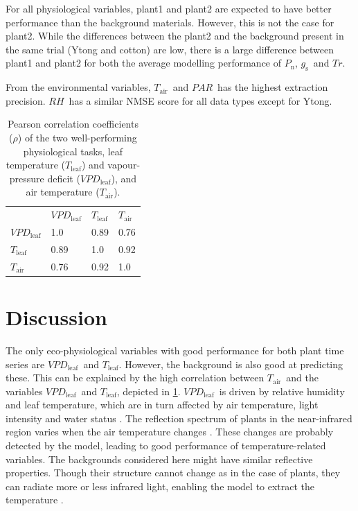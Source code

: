 \documentclass[10pt,authoryear,a4paper]{elsarticle}
\newcommand{\VPDL}{$VPD_\text{leaf}$}
\newcommand{\Tair}{$T_\text{air}$}
\newcommand{\Tleaf}{$T_\text{leaf}$}
\newcommand{\Cond}{$g_\text{s}$}
\newcommand{\Photo}{$P_\text{n}$}
\newcommand{\Transp}{$Tr$}
\newcommand{\RH}{$RH$}
\newcommand{\PAR}{$PAR$}
\begin{document}
        For all physiological variables, plant1 and plant2 are expected to have better performance than the background materials. However, this is not the case for plant2. While the differences between the plant2 and the background present in the same trial (Ytong and cotton) are low, there is a large difference between plant1 and plant2 for both the average modelling performance of \Photo, \Cond\ and \Transp.  
        
        From the environmental variables, \Tair\ and \PAR\ has the highest extraction precision. \RH\ has a similar NMSE score for all data types except for Ytong. 
        
        
        \begin{table}[thb]
            \centering
            \begin{tabular}{llll}
            \toprule
                       & \textbf{\VPDL} & \textbf{\Tleaf} & \textbf{\Tair} \\
                \textbf{\VPDL}  & 1.0   & 0.89   & 0.76  \\ 
                \textbf{\Tleaf} & 0.89  & 1.0    & 0.92  \\
                \textbf{\Tair}  & 0.76  & 0.92   & 1.0   \\ \bottomrule 
            \end{tabular}
            \caption{Pearson correlation coefficients ($\rho$) of the two well-performing physiological tasks, leaf temperature (\Tleaf) and vapour-pressure deficit (\VPDL), and air temperature (\Tair).}
            \label{physiological-environment-correlation}
        \end{table}
        
\section{Discussion}
    
    The only eco-physiological variables with good performance for both plant time series are \VPDL\ and \Tleaf. However, the background is also good at predicting these. This can be explained by the high correlation between \Tair\ and the variables \VPDL\ and \Tleaf, depicted in \cref{physiological-environment-correlation}. \VPDL\ is driven by relative humidity and leaf temperature, which are in turn affected by air temperature, light intensity and water status \citep{amitranoVapour2019}. The reflection spectrum of plants in the near-infrared region varies when the air temperature changes \citep{carterEffects2000}. These changes are probably detected by the model, leading to good performance of temperature-related variables. The backgrounds considered here might have similar reflective properties. Though their structure cannot change as in the case of plants, they can radiate more or less infrared light, enabling the model to extract the temperature \citep{beltranInfrared1997}.
    
\end{document}
